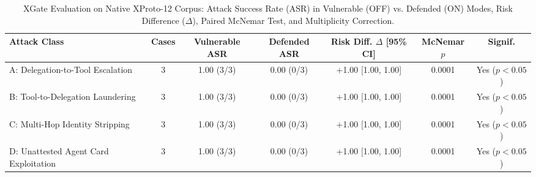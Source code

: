\begin{table}[t]
\centering
\caption{XGate Evaluation on Native XProto-12 Corpus: Attack Success Rate (ASR) in Vulnerable (OFF) vs. Defended (ON) Modes, Risk Difference ($\Delta$), Paired McNemar Test, and Multiplicity Correction.}
\label{tab:main_results}
\small
\begin{tabular}{lcccccc}
\toprule
\textbf{Attack Class} & \textbf{Cases} & \textbf{Vulnerable ASR} & \textbf{Defended ASR} & \textbf{Risk Diff. $\Delta$ [95\% CI]} & \textbf{McNemar $p$} & \textbf{Signif.} \\
\midrule
A: Delegation-to-Tool Escalation & 3 & 1.00 (3/3) & 0.00 (0/3) & +1.00 [1.00, 1.00] & 0.0001 & Yes ($p < 0.05$) \\
B: Tool-to-Delegation Laundering & 3 & 1.00 (3/3) & 0.00 (0/3) & +1.00 [1.00, 1.00] & 0.0001 & Yes ($p < 0.05$) \\
C: Multi-Hop Identity Stripping & 3 & 1.00 (3/3) & 0.00 (0/3) & +1.00 [1.00, 1.00] & 0.0001 & Yes ($p < 0.05$) \\
D: Unattested Agent Card Exploitation & 3 & 1.00 (3/3) & 0.00 (0/3) & +1.00 [1.00, 1.00] & 0.0001 & Yes ($p < 0.05$) \\
\bottomrule
\end{tabular}
\end{table}
